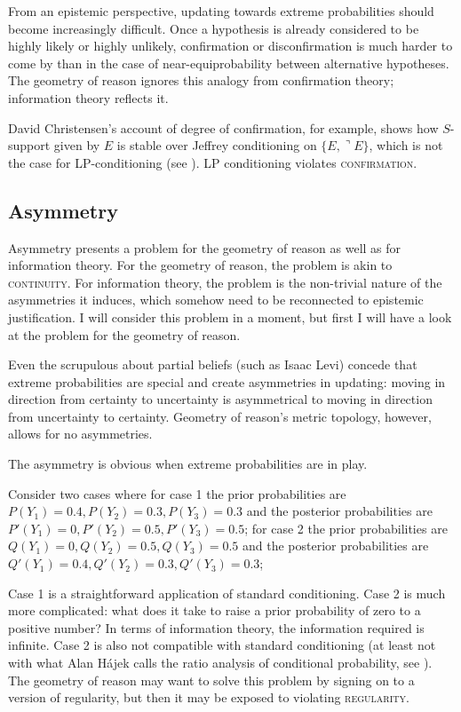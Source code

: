 \documentclass[11pt]{article}
\begin{document}
From an epistemic perspective, updating towards extreme probabilities
should become increasingly difficult. Once a hypothesis is already
considered to be highly likely or highly unlikely, confirmation or
disconfirmation is much harder to come by than in the case of
near-equiprobability between alternative hypotheses. The geometry of
reason ignores this analogy from confirmation theory; information
theory reflects it.

David Christensen's account of degree of confirmation, for example,
shows how $S$-support given by $E$ is stable over Jeffrey conditioning
on $\{E,\urcorner{}E\}$, which is not the case for LP-conditioning
(see ). LP conditioning violates
\textsc{confirmation}.

\subsection{Asymmetry}
\label{Asymmetry}

Asymmetry presents a problem for the geometry of reason as well as for
information theory. For the geometry of reason, the problem is akin to
\textsc{continuity}. For information theory, the problem is the
non-trivial nature of the asymmetries it induces, which somehow need
to be reconnected to epistemic justification. I will consider this
problem in a moment, but first I will have a look at the problem for
the geometry of reason.

Even the scrupulous about partial beliefs (such as Isaac Levi) concede
that extreme probabilities are special and create asymmetries in
updating: moving in direction from certainty to uncertainty is
asymmetrical to moving in direction from uncertainty to certainty.
Geometry of reason's metric topology, however, allows for no
asymmetries.

The asymmetry is obvious when extreme probabilities are in play.

\begin{quotex}
  \label{ex:extreme} Consider two cases
  where for case 1 the prior probabilities are
  $P(Y_{1})=0.4,P(Y_{2})=0.3,P(Y_{3})=0.3$ and the posterior
  probabilities are $P'(Y_{1})=0,P'(Y_{2})=0.5,P'(Y_{3})=0.5$; for
  case 2 the prior probabilities are
  $Q(Y_{1})=0,Q(Y_{2})=0.5,Q(Y_{3})=0.5$ and the posterior
  probabilities are $Q'(Y_{1})=0.4,Q'(Y_{2})=0.3,Q'(Y_{3})=0.3$;
\end{quotex}

Case 1 is a straightforward application of standard conditioning. Case
2 is much more complicated: what does it take to raise a prior
probability of zero to a positive number? In terms of information
theory, the information required is infinite. Case 2 is also not
compatible with standard conditioning (at least not with what Alan
H{\'a}jek calls the ratio analysis of conditional probability, see
). The geometry of reason may want to solve this
problem by signing on to a version of regularity, but then it may be
exposed to violating \textsc{regularity}.
\end{document}
